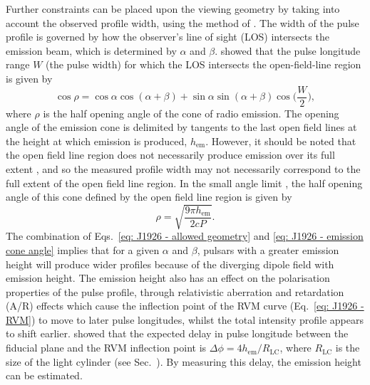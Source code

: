 Further constraints can be placed upon the viewing geometry by taking into account the observed profile width, using the method of \citet{RWJx2015a}. The width of the pulse profile is governed by how the observer's line of sight (LOS) intersects the emission beam, which is determined by $\alpha$ and $\beta$. \citet{GGRx1984} showed that the pulse longitude range $W$ (the pulse width) for which the LOS intersects the open-field-line region is given by 
\begin{equation}
    \label{eq: J1926 - allowed geometry}
    \cos\rho = \cos\alpha\cos(\alpha+\beta)+\sin\alpha\sin(\alpha+\beta)\cos\bigg(\frac{W}{2}\bigg),
\end{equation}
where $\rho$ is the half opening angle of the cone of radio emission. The opening angle of the emission cone is delimited by tangents to the last open field lines at the height at which emission is produced, $h_\mathrm{em}$. However, it should be noted that the open field line region does not necessarily produce emission over its full extent \citep[e.g][]{LMxx1988}, and so the measured profile width may not necessarily correspond to the full extent of the open field line region. In the small angle limit \citep[i.e. $h_\mathrm{em} \ll R_\mathrm{LC}$, e.g.][]{Rxxx1990}, the half opening angle of this cone defined by the open field line region is given by
\begin{equation}
    \label{eq: J1926 - emission cone angle}
    \rho = \sqrt{\frac{9\pi h_\mathrm{em}}{2cP}}.
\end{equation} 
The combination of Eqs.~\eqref{eq: J1926 - allowed geometry} and \eqref{eq: J1926 - emission cone angle} implies that for a given $\alpha$ and $\beta$, pulsars with a greater emission height will produce wider profiles because of the diverging dipole field with emission height. The emission height also has an effect on the polarisation properties of the pulse profile, through relativistic aberration and retardation (A/R) effects which cause the inflection point of the RVM curve (Eq.~\eqref{eq: J1926 - RVM}) to move to later pulse longitudes, whilst the total intensity profile appears to shift earlier. \citet{BCWx1991} showed that the expected delay in pulse longitude between the fiducial plane and the RVM inflection point is $\Delta\phi = 4h_\mathrm{em}/R_\mathrm{LC}$, where $R_\mathrm{LC}$ is the size of the light cylinder (see Sec.~). By measuring this delay, the emission height can be estimated.

